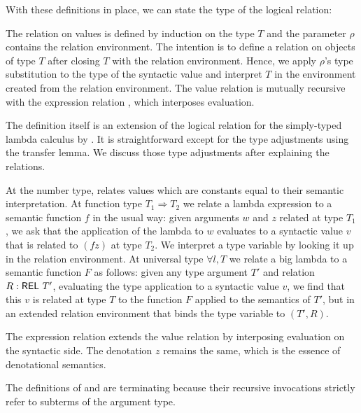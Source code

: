 \documentclass[sigplan,anonymous,review,screen]{acmart}
\begin{document}
With these definitions in place, we can state the type of the logical
relation:

\LogicalMCVType 
\LogicalMCVBody 
\LogicalMCE

The  relation {\AVSem} on values is defined by induction on the type $T$ and the parameter
$\rho$ contains the relation environment. The intention is to define a
relation on objects of type $T$ after closing $T$ with the relation
environment. Hence, we apply $\rho$'s type substitution to the type of
the syntactic value and interpret $T$ in the environment created from
the relation environment.
The value relation is mutually recursive with the expression relation
{\AESem}, which interposes evaluation.

The definition itself is an extension of the logical relation for the
simply-typed lambda calculus by
\citet{DBLP:journals/jar/BentonHKM12}. It is straightforward
except for the type adjustments using the transfer lemma. We
discuss those type adjustments after explaining the relations.

At the number type, {\AVSem} relates values which are constants equal to their semantic
interpretation. 
At function type $T_1 \Rightarrow T_2$ we relate a lambda expression
to a semantic function $f$ in
the usual way: given arguments $w$ and $z$ related at type $T_1$, we ask that the
application of the lambda to $w$ evaluates to a syntactic value $v$ that is
related to $(f z)$ at type $T_2$.
We interpret a type variable by looking it up in the relation
environment.
At universal type $\forall l, T$ we relate a big lambda to a semantic
function $F$ as follows: given any type argument $T'$ and relation $R :
\AREL\ T'$, evaluating the type application to a syntactic value $v$,
we find that this $v$ is related at type $T$ to the
function $F$ applied to the semantics of $T'$, but in an extended
relation environment that binds the type variable to $(T', R)$.

The expression relation {\AESem}  extends the value relation by interposing
evaluation on the syntactic side. The denotation $z$ remains the
same, which is the essence of denotational semantics. 


The definitions of {\AVSem} and {\AESem} are terminating because their
recursive invocations strictly refer to subterms of the argument type.
\end{document}
